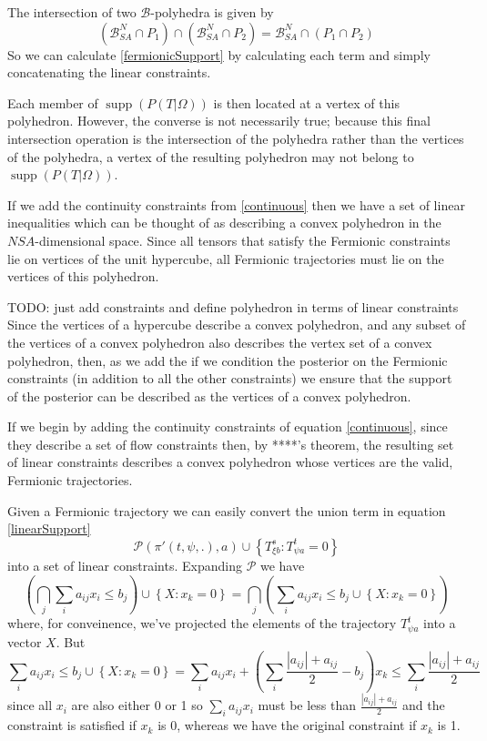 \documentclass{article}
\DeclareMathOperator\supp{supp}
\begin{document}
The intersection of two $\mathcal{B}$-polyhedra is given by
\[
(\mathcal{B}^N_{SA} \cap P_1) \cap (\mathcal{B}^N_{SA} \cap P_2) = \mathcal{B}^N_{SA} \cap (P_1 \cap P_2)
\]
So we can calculate \ref{fermionicSupport} by calculating each term and simply concatenating the linear constraints.

Each member of $\supp (P( T |\Omega))$ is then located at a vertex of this polyhedron. However, the converse is not necessarily true; because this final intersection operation is the intersection of the polyhedra rather than the vertices of the polyhedra, a vertex of the resulting polyhedron may not belong to $\supp (P( T |\Omega))$. 

If we add the continuity constraints from \ref{continuous} then we have a set of linear inequalities which can be thought of as describing a convex polyhedron in the $NSA$-dimensional space. Since all tensors that satisfy the Fermionic constraints lie on vertices of the unit hypercube, all Fermionic trajectories must lie on the vertices of this polyhedron.



TODO: just add constraints and define polyhedron in terms of linear constraints
Since the vertices of a hypercube describe a convex polyhedron, and any subset of the vertices of a convex polyhedron also describes the vertex set of a convex polyhedron, then, as we add the  if we condition the posterior on the Fermionic constraints (in addition to all the other constraints) we ensure that the support of the posterior can be described as the vertices of a convex polyhedron.



If we begin by adding the continuity constraints of equation \ref{continuous}, since they describe a set of flow constraints then, by ****'s theorem, the resulting set of linear constraints describes a convex polyhedron whose vertices are the valid, Fermionic trajectories.


Given a Fermionic trajectory we can easily convert the union term in equation \ref{linearSupport} 
\[
\mathcal{P}(\pi'(t,\psi,.), a) \cup \left\{T^s_{\xi b}: T^t_{\psi a} = 0\right\}
\]
into a set of linear constraints. Expanding $\mathcal{P}$ we have
\[
\left(\bigcap_j \sum_i a_{ij}x_i \le b_j \right) \cup \left\{X: x_k = 0\right\} = \bigcap_j \left( \sum_i a_{ij}x_i \le b_j  \cup \left\{X: x_k = 0\right\}\right)
\]
where, for conveinence, we've projected the elements of the trajectory $T^t_{\psi a}$ into a vector $X$. But
\[
\sum_i a_{ij}x_i \le b_j  \cup \left\{X: x_k = 0\right\} = \sum_i a_{ij}x_i + \left(\sum_i \frac{|a_{ij}| + a_{ij}}{2} - b_j\right)x_k \le \sum_i \frac{|a_{ij}| + a_{ij}}{2} 
\]
since all $x_i$ are also either 0 or 1 so $\sum_i a_{ij}x_i$ must be less than $\frac{|a_{ij}| + a_{ij}}{2}$ and the constraint is satisfied if $x_k$ is 0, whereas we have the original constraint if $x_k$ is 1.
\end{document}
